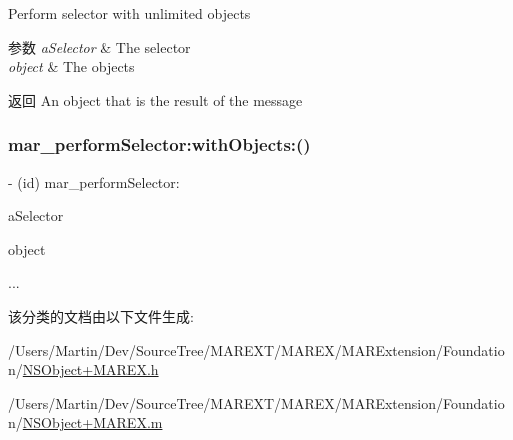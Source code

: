 Perform selector with unlimited objects


\begin{DoxyParams}{参数}
{\em a\+Selector} & The selector \\
\hline
{\em object} & The objects\\
\hline
\end{DoxyParams}
\begin{DoxyReturn}{返回}
An object that is the result of the message 
\end{DoxyReturn}
\mbox{\label{category_n_s_object_07_m_a_r_e_x_08_ac7a7d5ae50da3fedd458d9abacfdfd25}} 
\subsubsection{\texorpdfstring{mar\+\_\+perform\+Selector\+:with\+Objects\+:()}{mar\_performSelector:withObjects:()}\hspace{0.1cm}{\footnotesize\ttfamily [2/2]}}
{\footnotesize\ttfamily -\/ (id) mar\+\_\+perform\+Selector\+: \begin{DoxyParamCaption}\item[{(S\+EL)}]{a\+Selector }\item[{withObjects:(id)}]{object }\item[{,}]{... }\end{DoxyParamCaption}\hspace{0.3cm}{\ttfamily [implementation]}}



该分类的文档由以下文件生成\+:\begin{DoxyCompactItemize}
\item 
/\+Users/\+Martin/\+Dev/\+Source\+Tree/\+M\+A\+R\+E\+X\+T/\+M\+A\+R\+E\+X/\+M\+A\+R\+Extension/\+Foundation/\hyperlink{_n_s_object_09_m_a_r_e_x_8h}{N\+S\+Object+\+M\+A\+R\+E\+X.\+h}\item 
/\+Users/\+Martin/\+Dev/\+Source\+Tree/\+M\+A\+R\+E\+X\+T/\+M\+A\+R\+E\+X/\+M\+A\+R\+Extension/\+Foundation/\hyperlink{_n_s_object_09_m_a_r_e_x_8m}{N\+S\+Object+\+M\+A\+R\+E\+X.\+m}\end{DoxyCompactItemize}
